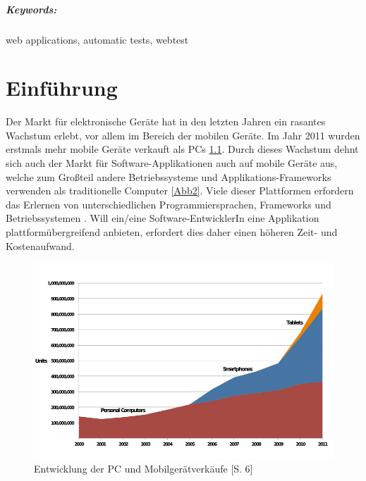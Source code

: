 \documentclass[a4paper,bibtotoc,oneside]{scrbook}
\begin{document}
\vfill
\paragraph*{Keywords:} web applications, automatic tests, webtest
\newpage


\tableofcontents\thispagestyle{empty}
\newpage

\setcounter{page}{1}

\chapter{Einführung}
Der Markt für elektronische Geräte hat in den letzten Jahren ein rasantes Wachstum erlebt, vor allem im Bereich der mobilen Geräte. Im Jahr 2011 wurden erstmals mehr mobile Geräte verkauft als PCs \ref{Abb1}.
Durch dieses Wachstum dehnt sich auch der Markt für Software-Applikationen auch auf mobile Geräte aus, welche zum Großteil andere Betriebssysteme und Applikations-Frameworks verwenden als traditionelle Computer \ref{Abb2}. Viele dieser Plattformen erfordern das Erlernen von unterschiedlichen Programmiersprachen, Frameworks und Betriebssystemen \cite{android}\cite{ios}. Will ein/eine Software-EntwicklerIn eine Applikation plattformübergreifend anbieten, erfordert dies daher einen höheren Zeit- und Kostenaufwand.

\begin{figure}[h!]
\centering
\includegraphics[width=150mm]{img/globaldevicesales.png}
\caption[Entwicklung der PC und Mobilgerätverkäufe]{Entwicklung der PC und Mobilgerätverkäufe \cite{devicesales}[S. 6]}\label{Abb1}
\end{figure}
\end{document}

